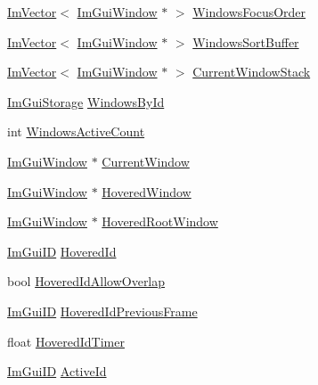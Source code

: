 \begin{DoxyCompactItemize}
\mbox{\hyperlink{class_im_vector}{Im\+Vector}}$<$ \mbox{\hyperlink{struct_im_gui_window}{Im\+Gui\+Window}} $\ast$ $>$ \mbox{\hyperlink{struct_im_gui_context_a1fd9e62737932c069dce5f137a4a4fab}{Windows\+Focus\+Order}}
\item 
\mbox{\hyperlink{class_im_vector}{Im\+Vector}}$<$ \mbox{\hyperlink{struct_im_gui_window}{Im\+Gui\+Window}} $\ast$ $>$ \mbox{\hyperlink{struct_im_gui_context_af33de778de28b057fa7a42e4cbe0017a}{Windows\+Sort\+Buffer}}
\item 
\mbox{\hyperlink{class_im_vector}{Im\+Vector}}$<$ \mbox{\hyperlink{struct_im_gui_window}{Im\+Gui\+Window}} $\ast$ $>$ \mbox{\hyperlink{struct_im_gui_context_a19020a20e7bca2fadbb287106b92891b}{Current\+Window\+Stack}}
\item 
\mbox{\hyperlink{struct_im_gui_storage}{Im\+Gui\+Storage}} \mbox{\hyperlink{struct_im_gui_context_adc1e46e1c1582a0f0eb74d957efedf98}{Windows\+By\+Id}}
\item 
int \mbox{\hyperlink{struct_im_gui_context_a95237c5f9eb869da0f1947c54a521489}{Windows\+Active\+Count}}
\item 
\mbox{\hyperlink{struct_im_gui_window}{Im\+Gui\+Window}} $\ast$ \mbox{\hyperlink{struct_im_gui_context_aa923044f396241668aef5ed2f4c4d847}{Current\+Window}}
\item 
\mbox{\hyperlink{struct_im_gui_window}{Im\+Gui\+Window}} $\ast$ \mbox{\hyperlink{struct_im_gui_context_a6dd89693704216a036d2676b8c6610f8}{Hovered\+Window}}
\item 
\mbox{\hyperlink{struct_im_gui_window}{Im\+Gui\+Window}} $\ast$ \mbox{\hyperlink{struct_im_gui_context_ae5dcb8bed41ff948af2cfba6c9ae36d9}{Hovered\+Root\+Window}}
\item 
\mbox{\hyperlink{imgui_8h_a1785c9b6f4e16406764a85f32582236f}{Im\+Gui\+ID}} \mbox{\hyperlink{struct_im_gui_context_a32bef5a7740179ad8076643b001f15e4}{Hovered\+Id}}
\item 
bool \mbox{\hyperlink{struct_im_gui_context_a171f67ac705994d413a0bccf491aa4e1}{Hovered\+Id\+Allow\+Overlap}}
\item 
\mbox{\hyperlink{imgui_8h_a1785c9b6f4e16406764a85f32582236f}{Im\+Gui\+ID}} \mbox{\hyperlink{struct_im_gui_context_a08742c14087e26304ff47fb9212d8eb6}{Hovered\+Id\+Previous\+Frame}}
\item 
float \mbox{\hyperlink{struct_im_gui_context_a07a6bd929503077394ea0f80965470f9}{Hovered\+Id\+Timer}}
\item 
\mbox{\hyperlink{imgui_8h_a1785c9b6f4e16406764a85f32582236f}{Im\+Gui\+ID}} \mbox{\hyperlink{struct_im_gui_context_a11c874eb6cf74ba9162bd1d01c4ccbcc}{Active\+Id}}

\end{DoxyCompactItemize}
